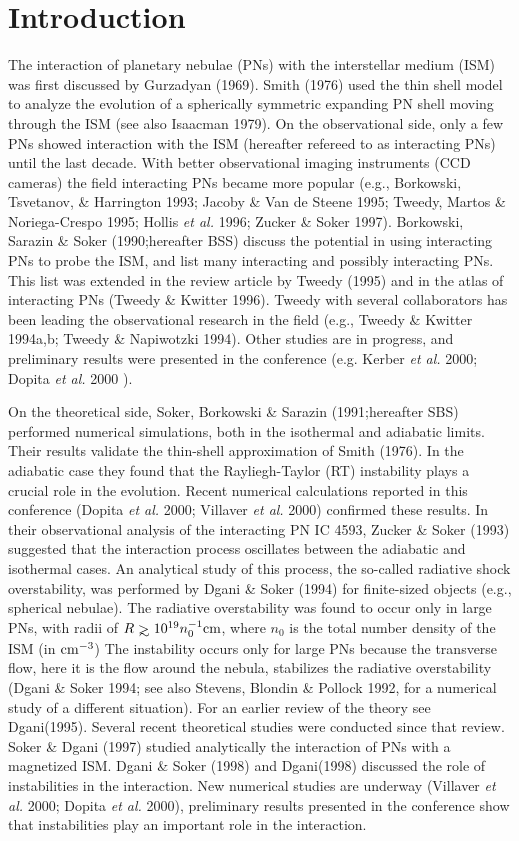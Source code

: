 \section{Introduction}
The interaction of planetary nebulae (PNs) with the interstellar medium (ISM)
was first discussed by Gurzadyan (1969). Smith (1976) used the thin shell model
to analyze the evolution of a spherically symmetric expanding PN shell
moving through the ISM (see also Isaacman 1979).
On the observational side, only a few PNs showed interaction with the ISM
(hereafter refereed to as interacting PNs) until the last decade.
With better observational imaging instruments (CCD cameras) the field
interacting PNs became more popular
(e.g., Borkowski, Tsvetanov, \& Harrington 1993; Jacoby \& Van de Steene 1995;
Tweedy, Martos \& Noriega-Crespo 1995; Hollis {\it et al.} 1996;
Zucker \& Soker 1997). Borkowski, Sarazin \& Soker (1990;hereafter  BSS) discuss
the potential in using interacting PNs to probe the ISM, and list many
interacting and possibly interacting PNs.
This list was extended in the review article by Tweedy (1995)
and in the atlas of interacting PNs (Tweedy \& Kwitter 1996). Tweedy
with several collaborators has been leading the observational research
in the field (e.g., Tweedy \& Kwitter 1994a,b; Tweedy \& Napiwotzki 1994).
Other studies are in progress, and preliminary
results were presented in the conference (e.g. Kerber {\it et al.} 2000;
Dopita {\it et al.} 2000 ).

On the theoretical side, Soker, Borkowski \& Sarazin (1991;hereafter
SBS) performed numerical simulations, both in the isothermal and adiabatic
limits.
Their results validate the thin-shell approximation of Smith (1976).
In the adiabatic case they found that the Rayliegh-Taylor (RT)
instability plays a crucial role in the evolution.
Recent numerical calculations reported in this conference
(Dopita {\it et al.} 2000; Villaver {\it et al.} 2000) confirmed these
results. In their observational analysis of the interacting PN IC 4593,
Zucker \& Soker (1993) suggested that the interaction process oscillates
between the adiabatic and isothermal cases.
An analytical study of this process, the so-called radiative shock
overstability, was performed by Dgani \& Soker (1994) for finite-sized
objects (e.g., spherical nebulae).
The radiative overstability was found to occur only in large
PNs, with radii of $R \gae 10^{19} n_0^{-1} \cm$, where $n_0$ is the
total number density of the ISM (in $\rm{cm}^{-3}$)
The instability occurs only for large PNs because  the transverse
flow, here it is the flow around the nebula, stabilizes the radiative
overstability (Dgani \& Soker 1994; see also
Stevens, Blondin \& Pollock 1992, for a numerical study of a different
situation).
For an earlier review of the theory see Dgani(1995).
Several recent theoretical studies were conducted since that review.
Soker \& Dgani (1997) studied analytically the interaction
of PNs with a magnetized ISM. Dgani \& Soker (1998) and Dgani(1998)  discussed
the role of instabilities in the interaction.
New numerical studies are underway (Villaver {\it et al.} 2000;
Dopita {\it et al.} 2000), preliminary results presented in the conference
show that instabilities play an important role in the interaction.

